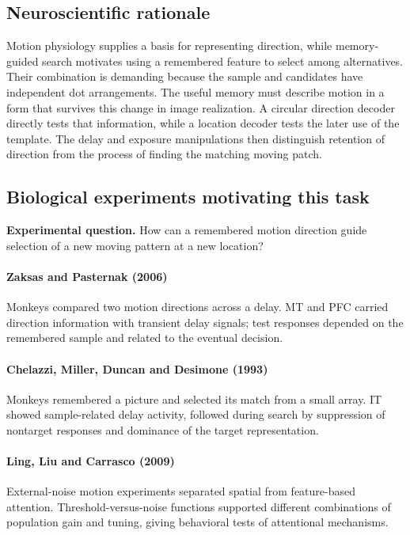 \documentclass[11pt]{article}
\begin{document}
\subsection{Neuroscientific rationale}
Motion physiology supplies a basis for representing direction, while memory-guided search motivates using a remembered feature to select among alternatives. Their combination is demanding because the sample and candidates have independent dot arrangements. The useful memory must describe motion in a form that survives this change in image realization. A circular direction decoder directly tests that information, while a location decoder tests the later use of the template. The delay and exposure manipulations then distinguish retention of direction from the process of finding the matching moving patch.

\subsection{Biological experiments motivating this task}
\textbf{Experimental question.} How can a remembered motion direction guide selection of a new moving pattern at a new location?

\paragraph{Zaksas and Pasternak (2006)} Monkeys compared two motion directions across a delay. MT and PFC carried direction information with transient delay signals; test responses depended on the remembered sample and related to the eventual decision. \cite{bio_zaksas}

\paragraph{Chelazzi, Miller, Duncan and Desimone (1993)} Monkeys remembered a picture and selected its match from a small array. IT showed sample-related delay activity, followed during search by suppression of nontarget responses and dominance of the target representation. \cite{bio_chelazzi}

\paragraph{Ling, Liu and Carrasco (2009)} External-noise motion experiments separated spatial from feature-based attention. Threshold-versus-noise functions supported different combinations of population gain and tuning, giving behavioral tests of attentional mechanisms. \cite{bio_ling}
\end{document}
